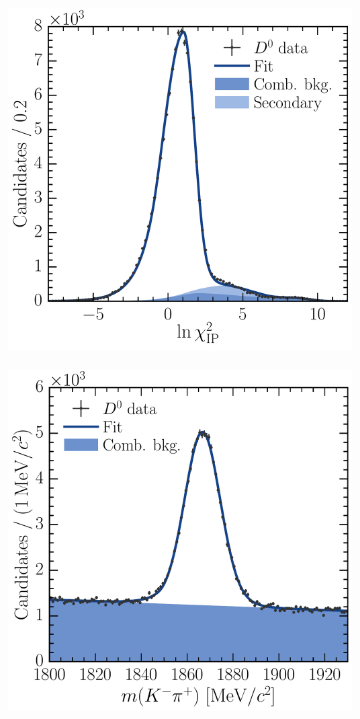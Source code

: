 \begin{figure}
\begin{subfigure}[b]{0.5\textwidth}
    \includegraphics[width=\textwidth]{figures/production/fitting/D0ToKpi_ipchisq_fit_pT_3_y_2}
    \caption{\lnipchisq}
    \label{fig:prod:fitting:D0ToKpi:ipchisq_high_sig}
  \end{subfigure}
  \begin{subfigure}[b]{0.5\textwidth}
    \centering
    \includegraphics[width=\textwidth]{figures/production/fitting/D0ToKpi_mass_fit_pT_0_y_3}

\end{subfigure}
\end{figure}
